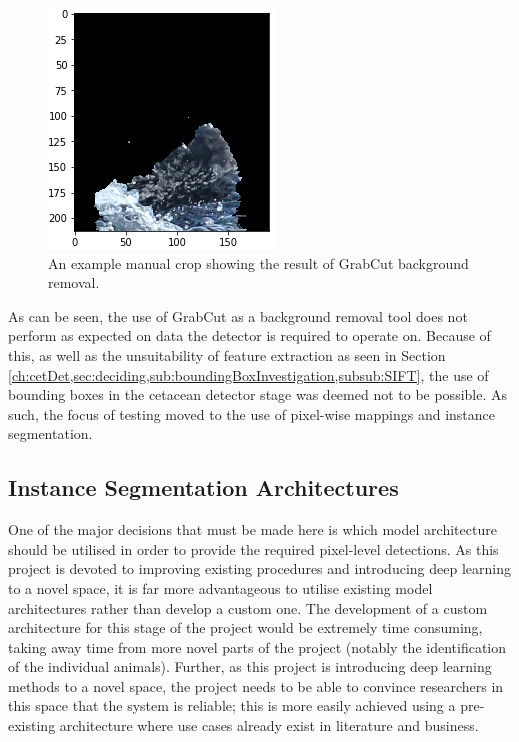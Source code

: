 \begin{figure}
	\begin{center}
		\includegraphics[scale=0.6]{Chapter3/figs/grabcut-example.png}
	\end{center}
	\caption{An example manual crop showing the result of GrabCut background removal.
	}
	\label{fig:grabcut-example}
\end{figure}

As can be seen, the use of GrabCut as a background removal tool does not perform as expected on data the detector is required to operate on. Because of this, as well as the unsuitability of feature extraction as seen in Section \ref{ch:cetDet,sec:deciding,sub:boundingBoxInvestigation,subsub:SIFT}, the use of bounding boxes in the cetacean detector stage was deemed not to be possible. As such, the focus of testing moved to the use of pixel-wise mappings and instance segmentation.  

\subsection{Instance Segmentation Architectures}\label{ch:cetDet,sec:deciding,sub:instanceSegArchitectures}

One of the major decisions that must be made here is which model architecture should be utilised in order to provide the required pixel-level detections. As this project is devoted to improving existing procedures and introducing deep learning to a novel space, it is far more advantageous to utilise existing model architectures rather than develop a custom one. The development of a custom architecture for this stage of the project would be extremely time consuming, taking away time from more novel parts of the project (notably the identification of the individual animals). Further, as this project is introducing deep learning methods to a novel space, the project needs to be able to convince researchers in this space that the system is reliable; this is more easily achieved using a pre-existing architecture where use cases already exist in literature and business. 

